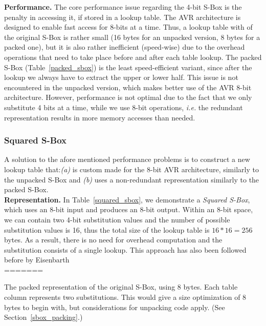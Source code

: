 \documentclass[11pt]{article}
\begin{document}
\begin{table}[h]
\textbf{Performance.} The core performance issue regarding the 4-bit S-Box is the penalty in accessing it, if stored in a lookup table. The AVR architecture is designed to enable fast access for 8-bits at a time. Thus, a lookup table with of the original S-Box is rather small (16 bytes for an unpacked version, 8 bytes for a packed one), but it is also rather inefficient (speed-wise) due to the overhead operations that need to take place before and after each table lookup. The packed S-Box (Table~\ref{packed_sbox}) is the least speed-efficient variant, since after the lookup we always have to extract the upper or lower half. This issue is not encountered in the unpacked version, which makes better use of the AVR 8-bit architecture. However, performance is not optimal  due to the fact that we only substitute 4 bits at a time, while we use 8-bit operations, \emph{i.e.} the redundant representation results in more memory accesses than needed. 

\subsubsection{Squared S-Box}\label{ssbox}
A solution to the afore mentioned performance problems is to construct a new lookup table that:\emph{(a)} is custom made for the 8-bit AVR architecture, similarly to the unpacked S-Box and \emph{(b)} uses a non-redundant representation similarly to the packed S-Box.\\
\textbf{Representation.} In Table~\ref{squared_sbox}, we demonstrate a \emph{Squared S-Box}, which uses an 8-bit input and produces an 8-bit output. Within an 8-bit space, we can contain two 4-bit substitution values and the number of possible substitution values is 16, thus the total size of the lookup table is $16*16=256$ bytes. As a result, there is no need for overhead computation and the substitution consists of a single lookup. This approach has also been followed before by Eisenbarth~\cite{eisenbarth2012compact}\\
=======
 \caption{\scriptsize The packed representation of the original S-Box, using 8 bytes. Each table column represents two substitutions. This would give a size optimization of 8 bytes to begin with, but considerations for unpacking code apply. (See Section~\ref{sbox_packing}.)}
 \label{packed_sbox}
\end{table}\\
\end{document}
